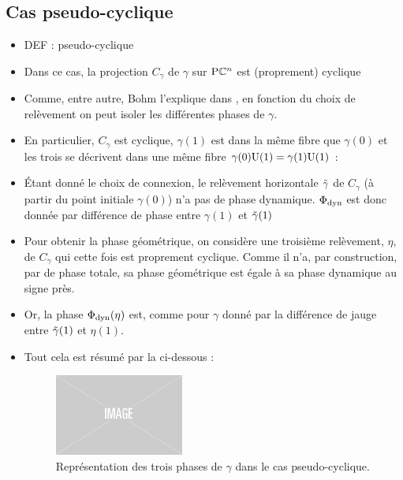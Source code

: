 \subsection{Cas pseudo-cyclique}

\begin{itemize}
	\item DEF : pseudo-cyclique
	
	\item Dans ce cas, la projection $C_\gamma$ de $\gamma$ sur $\text{\normalfont P}\mathbb{C}^{n}$ est (proprement) cyclique
	
	\item Comme, entre autre, Bohm l'explique dans \cite{bohm_geometric_2003}, en fonction du choix de relèvement on peut isoler les différentes phases de $\gamma$. 
	
	\item En particulier, $C_\gamma$ est cyclique, $\gamma(1)$ est dans la même fibre que $\gamma(0)$ et les trois se décrivent dans une même fibre $\gamma(0)\text{\normalfont U}(1) = \gamma(1)\text{\normalfont U}(1)$ :
	
	\item Étant donné le choix de connexion, le relèvement horizontale $\Tilde{\gamma}$ de $C_\gamma$ (à partir du point initiale $\gamma(0)$) n'a pas de phase dynamique. $\Phi_{\text{\normalfont dyn}}$ est donc donnée par différence de phase entre $\gamma(1)$ et $\Tilde{\gamma}(1)$
	
	\item Pour obtenir la phase géométrique, on considère une troisième relèvement, $\eta$, de $C_\gamma$ qui cette fois est proprement cyclique. Comme il n'a, par construction, par de phase totale, sa phase géométrique est égale à sa phase dynamique au signe près.
	
	\item Or, la phase $\Phi_{\text{\normalfont dyn}}(\eta)$ est, comme pour $\gamma$ donné par la différence de jauge entre $\Tilde{\gamma}(1)$ et $\eta(1)$.
	
	\item Tout cela est résumé par la  ci-dessous :
	\begin{figure}[h]
		\includegraphics[width=0.4\textwidth]{fig/placeholder}
		\caption[Représentation des trois phases de $\gamma$ dans le cas pseudo-cyclique]{Représentation des trois phases de $\gamma$ dans le cas pseudo-cyclique.}
		\label{fig:phases_p-cycl}
	\end{figure}
	

\end{itemize}
